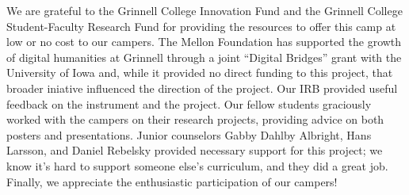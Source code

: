 \begin{acks}
{\small
We are grateful to the Grinnell College Innovation Fund and the
Grinnell College Student-Faculty Research Fund for providing the
resources to offer this camp at low or no cost to our campers.  The
Mellon Foundation has supported the growth of digital humanities
at Grinnell through a joint ``Digital Bridges'' grant with the
University of Iowa and, while it provided no direct funding to this
project, that broader iniative influenced the direction of the
project.  Our IRB provided useful feedback on the instrument and
the project.  Our fellow students graciously worked with the campers
on their research projects, providing advice on both posters and
presentations.  Junior counselors Gabby Dahlby Albright, Hans
Larsson, and Daniel Rebelsky provided necessary support for this
project; we know it's hard to support someone else's curriculum,
and they did a great job.  Finally, we appreciate the enthusiastic
participation of our campers!} 
\end{acks}

